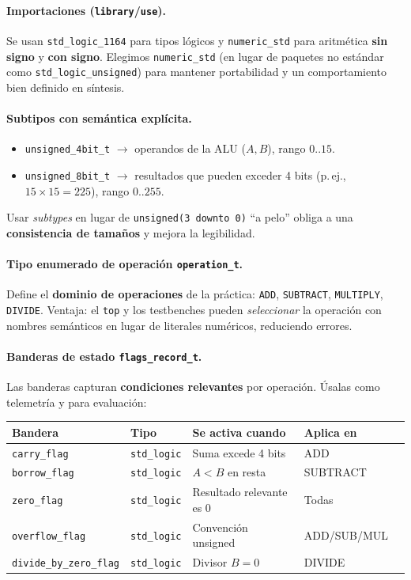 \documentclass[a4paper,12pt]{article}
\begin{document}
\paragraph{Importaciones (\texttt{library}/\texttt{use}).}
Se usan \texttt{std\_logic\_1164} para tipos lógicos y \texttt{numeric\_std} para aritmética \textbf{sin signo} y \textbf{con signo}. Elegimos \texttt{numeric\_std} (en lugar de paquetes no estándar como \texttt{std\_logic\_unsigned}) para mantener portabilidad y un comportamiento bien definido en síntesis.

\paragraph{Subtipos con semántica explícita.}
\begin{itemize}
  \item \texttt{unsigned\_4bit\_t} $\rightarrow$ operandos de la ALU (\(A,B\)), rango \(0..15\).
  \item \texttt{unsigned\_8bit\_t} $\rightarrow$ resultados que pueden exceder 4 bits (p.\,ej., \(15\times15=225\)), rango \(0..255\).
\end{itemize}
Usar \textit{subtypes} en lugar de \texttt{unsigned(3 downto 0)} “a pelo” obliga a una \textbf{consistencia de tamaños} y mejora la legibilidad.

\paragraph{Tipo enumerado de operación \texttt{operation\_t}.}
Define el \textbf{dominio de operaciones} de la práctica:
\texttt{ADD}, \texttt{SUBTRACT}, \texttt{MULTIPLY}, \texttt{DIVIDE}.  
Ventaja: el \texttt{top} y los testbenches pueden \emph{seleccionar} la operación con nombres semánticos en lugar de literales numéricos, reduciendo errores.

\paragraph{Banderas de estado \texttt{flags\_record\_t}.}
Las banderas capturan \textbf{condiciones relevantes} por operación. Úsalas como telemetría y para evaluación:
\begin{center}
\begin{tabular}{@{}lllll@{}}
\toprule
\textbf{Bandera} & \textbf{Tipo} & \textbf{Se activa cuando} & \textbf{Aplica en}  \\
\midrule
\texttt{carry\_flag} & \texttt{std\_logic} & Suma excede 4 bits & ADD  \\
\texttt{borrow\_flag} & \texttt{std\_logic} & \(A<B\) en resta & SUBTRACT  \\
\texttt{zero\_flag} & \texttt{std\_logic} & Resultado relevante es 0 & Todas  \\
\texttt{overflow\_flag} & \texttt{std\_logic} & Convención unsigned & ADD/SUB/MUL \\
\texttt{divide\_by\_zero\_flag} & \texttt{std\_logic} & Divisor \(B=0\) & DIVIDE \\
\bottomrule
\end{tabular}
\end{center}
\end{document}

